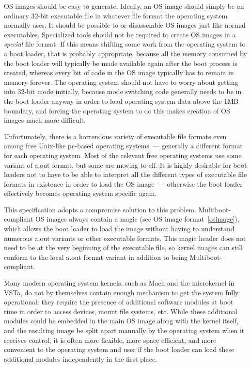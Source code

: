 
OS images should be easy to generate. Ideally, an OS image should simply be an
ordinary 32-bit executable file in whatever file format the operating system
normally uses. It should be possible to  or disassemble OS images just
like normal executables. Specialized tools should not be required to create OS
images in a \emph{special} file format. If this means shifting some work from
the operating system to a boot loader, that is probably appropriate, because all
the memory consumed by the boot loader will typically be made available again
after the boot process is created, whereas every bit of code in the OS image
typically has to remain in memory forever. The operating system should not have
to worry about getting into 32-bit mode initially, because mode switching code
generally needs to be in the boot loader anyway in order to load operating
system data above the 1MB boundary, and forcing the operating system to do this
makes creation of OS images much more difficult.

Unfortunately, there is a horrendous variety of executable file formats even
among free Unix-like pc-based operating systems\ --- generally a different
format for each operating system. Most of the relevant free operating systems
use some variant of a.out format, but some are moving to elf. It is highly
desirable for boot loaders not to have to be able to interpret all the different
types of executable file formats in existence in order to load the OS image\ ---
otherwise the boot loader effectively becomes operating system specific again.

This specification adopts a compromise solution to this problem.
Multiboot-compliant OS images always contain a magic 
(see OS image format\ \ref{osimage}), which allows the boot loader to load the
image without having to understand numerous a.out variants or other executable formats. This magic
header does not need to be at the very beginning of the executable file, so
kernel images can still conform to the local a.out format variant in addition to
being Multiboot-compliant.


Many modern operating system kernels, such as Mach and the microkernel in VSTa,
do not by themselves contain enough mechanism to get the system fully
operational: they require the presence of additional software modules at boot
time in order to access devices, mount file systems, etc. While these additional
modules could be embedded in the main OS image along with the kernel itself, and
the resulting image be split apart manually by the operating system when it
receives control, it is often more flexible, more space-efficient, and more
convenient to the operating system and user if the boot loader can load these
additional modules independently in the first place.

